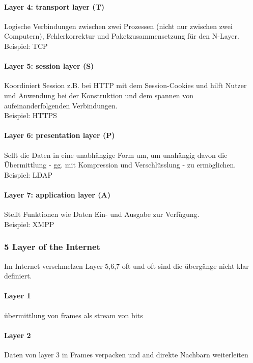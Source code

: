                 \paragraph{Layer 4: transport layer (T)}
                    Logische Verbindungen zwischen zwei Prozessen (nicht nur zwischen zwei Computern), Fehlerkorrektur und Paketzusammensetzung für den N-Layer. \\
                    Beispiel: TCP
                
                \paragraph{Layer 5: session layer (S)}
                    Koordiniert Session z.B. bei HTTP mit dem Session-Cookies und hilft Nutzer und Anwendung bei der Konstruktion und dem spannen von aufeinanderfolgenden Verbindungen. \\
                    Beispiel: HTTPS
                
                \paragraph{Layer 6: presentation layer (P)}
                    Sellt die Daten in eine unabhängige Form um, um unahängig davon die Übermittlung - gg. mit Kompression und Verschlüsslung - zu ermöglichen. \\
                    Beispiel: LDAP
                
                \paragraph{Layer 7: application layer (A)}
                    Stellt Funktionen wie Daten Ein- und Ausgabe zur Verfügung. \\
                    Beispiel: XMPP
        \subsubsection{5 Layer of the Internet}
            Im Internet verschmelzen Layer 5,6,7 oft und oft sind die übergänge nicht klar definiert. 
            \paragraph{Layer 1}
               übermittlung von frames als stream von bits
            
            \paragraph{Layer 2}
                Daten von layer 3 in Frames verpacken und and direkte Nachbarn weiterleiten
            
